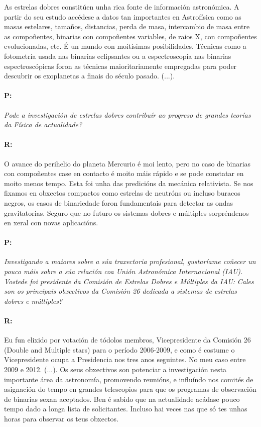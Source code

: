 \begin{multicols}{2}
As estrelas dobres constitúen unha rica fonte de información
astronómica. A partir do seu estudo accédese a datos tan importantes en
Astrofísica como as masas estelares, tamaños, distancias, perda de masa,
intercambio de masa entre as compoñentes, binarias con compoñentes variables,
de raios X, con compoñentes evolucionadas, etc. É un mundo con moitísimas
posibilidades. Técnicas como a fotometría usada nas binarias eclipsantes ou a
espectroscopia nas binarias espectroscópicas foron as técnicas maioritariamente
empregadas para poder descubrir os exoplanetas a finais do século pasado.
(...).

\paragraph{P:}

\textit{ Pode a investigación de estrelas dobres contribuír ao progreso de
grandes teorías da Física de actualidade? }

\paragraph{R:}

O avance do perihelio do planeta Mercurio é moi lento, pero no
caso de binarias con compoñentes case en contacto é moito máis rápido e se pode
constatar en moito menos tempo. Esta foi unha das predicións da mecánica
relativista. Se nos fixamos en obxectos compactos como estrelas de neutróns ou
incluso buracos negros, os casos de binariedade foron fundamentais para
detectar as ondas gravitatorias. Seguro que no futuro os sistemas dobres e
múltiples sorpréndenos en xeral con novas aplicacións.

\paragraph{P:}

\textit{ Investigando a maiores sobre a súa traxectoria profesional, gustaríame
coñecer un pouco máis sobre a súa relación coa Unión Astronómica Internacional
(IAU). Vostede foi presidente da Comisión de Estrelas Dobres e Múltiples da
IAU: Cales son os principais obxectivos da Comisión 26 dedicada a sistemas de
estrelas dobres e múltiples? }

\paragraph{R:}

Eu fun elixido por votación de tódolos membros, Vicepresidente da Comisión 26
(Double and Multiple stars) para o período 2006-2009, e como é costume o
Vicepresidente ocupa a Presidencia nos tres anos seguintes. No meu caso entre
2009 e 2012. (...). Os seus obxectivos son potenciar a investigación nesta
importante área da astronomía, promovendo reunións, e influíndo nos comités de
asignación do tempo en grandes telescopios para que os programas de observación
de binarias sexan aceptados. Ben é sabido que na actualidade acádase pouco
tempo dado a longa lista de solicitantes. Incluso hai veces nas que só tes
unhas horas para observar os teus obxectos.


\end{multicols}

